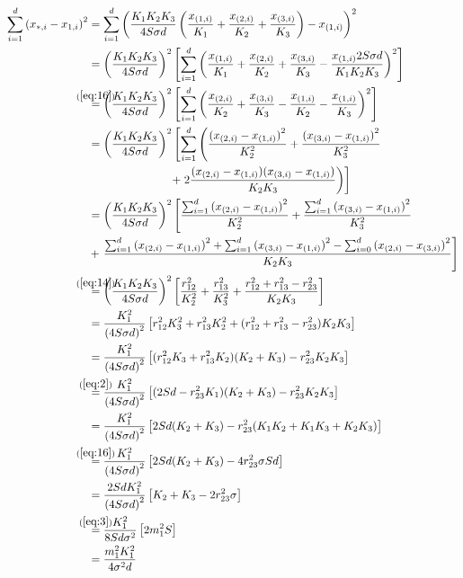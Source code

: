 \begin{align}
  \sum_{i=1}^d {(x_{\ast,i} - x_{1,i})}^2
  &= \sum_{i=1}^d { \left( \frac{K_1 K_2 K_3}{4 S \sigma d}
    \left( \frac{x_{(1,i)}}{K_1} + \frac{x_{(2,i)}}{K_2} + \frac{x_{(3,i)}}{K_3}
    \right) - x_{(1,i)} \right) }^2 \\
  &= { \left( \frac{K_1 K_2 K_3}{4 S \sigma d} \right) }^2 \left[ \sum_{i=1}^d
    { \left( \frac{x_{(1,i)}}{K_1} + \frac{x_{(2,i)}}{K_2} +
    \frac{x_{(3,i)}}{K_3} - \frac{x_{(1,i)} 2 S \sigma d}{K_1 K_2 K_3}
    \right) }^2 \right] \\
  &\stackrel{\mathclap{(\ref{eq:16})}}{=}
    {\left( \frac{K_1 K_2 K_3}{4 S \sigma d} \right)}^2 \left[ \sum_{i=1}^d
    {\left( \frac{x_{(2,i)}}{K_2} + \frac{x_{(3,i)}}{K_3} - \frac{x_{(1,i)}}{K_2} -
    \frac{x_{(1,i)}}{K_3} \right)}^2 \right] \\
  &= {\left( \frac{K_1 K_2 K_3}{4 S \sigma d} \right)}^2 \left[ \sum_{i=1}^d
    \left( \frac{{(x_{(2,i)} - x_{(1,i)})}^2}{K_2^2} +
    \frac{{(x_{(3,i)} - x_{(1,i)})}^2}{K_3^2} \right. \right. \\
  &\hspace{7em} \left. \left. + \; 2 \frac{(x_{(2,i)} - x_{(1,i)})(x_{(3,i)} -
    x_{(1,i)})}{K_2 K_3} \right) \right] \\
  &= {\left( \frac{K_1 K_2 K_3}{4 S \sigma d} \right)}^2
    \left[ \frac{\sum_{i=1}^d {(x_{(2,i)} - x_{(1,i)})}^2}{K_2^2} +
    \frac{\sum_{i=1}^d {(x_{(3,i)} - x_{(1,i)})}^2}{K_3^2} \right. \\
  &+ \left. \frac{ \sum_{i=1}^d {(x_{(2,i)} - x_{(1,i)})}^2 +
    \sum_{i=1}^d {(x_{(3,i)} - x_{(1,i)})}^2 -
    \sum_{i=0}^d {(x_{(2,i)} - x_{(3,i)})}^2}{K_2 K_3} \right] \\
  &\stackrel{\mathclap{(\ref{eq:14})}}{=}
    {\left( \frac{K_1 K_2 K_3}{4 S \sigma d} \right)}^2
    \left[ \frac{r_{12}^2}{K_2^2} + \frac{r_{13}^2}{K_3^2} +
    \frac{r_{12}^2 + r_{13}^2 - r_{23}^2}{K_2 K_3} \right] \\
  &= \frac{K_1^2}{{(4 S \sigma d)}^2}
    \left[ r_{12}^2 K_3^2 + r_{13}^2 K_2^2 +
    (r_{12}^2 + r_{13}^2 - r_{23}^2) K_2 K_3 \right] \\
  &= \frac{K_1^2}{{(4 S \sigma d)}^2}
    \left[ (r_{12}^2 K_3 + r_{13}^2 K_2) (K_2 + K_3) -
    r_{23}^2 K_2 K_3 \right] \\
  &\stackrel{\mathclap{(\ref{eq:2})}}{=}
    \frac{K_1^2}{{(4 S \sigma d)}^2}
    \left[ (2 S d - r_{23}^2 K_1) (K_2 + K_3) - r_{23}^2 K_2 K_3 \right] \\
  &= \frac{K_1^2}{{(4 S \sigma d)}^2}
    \left[ 2 S d (K_2 + K_3) - r_{23}^2 (K_1 K_2 + K_1 K_3 + K_2 K_3) \right] \\
  &\stackrel{\mathclap{(\ref{eq:16})}}{=}
    \frac{K_1^2}{{(4 S \sigma d)}^2}
    \left[ 2 S d (K_2 + K_3) - 4 r_{23}^2 \sigma S d \right] \\
  &= \frac{2 S d K_1^2}{{(4 S \sigma d)}^2}
    \left[ K_2 + K_3 - 2 r_{23}^2 \sigma \right] \\
  &\stackrel{\mathclap{(\ref{eq:3})}}{=}
    \frac{K_1^2}{8 S d \sigma^2}
    \left[ 2 m_1^2 S \right] \\
  &= \frac{m_1^2 K_1^2}{4 \sigma^2 d}
\end{align}
